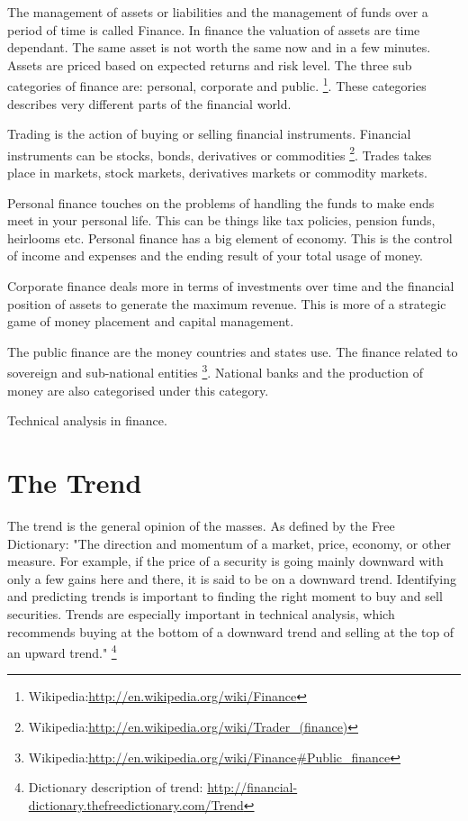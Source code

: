 
The management of assets or liabilities and the management of funds over a
period of time is called Finance. In finance the valuation of assets are time
dependant. The same asset is not worth the same now and in a few minutes. Assets are
priced based on expected returns and risk level. The three sub categories of
finance are: personal, corporate and public. 
\footnote{Wikipedia:\url{http://en.wikipedia.org/wiki/Finance}}.
These categories describes very different parts of the financial world. 

Trading is the action of buying or selling financial instruments.
Financial instruments can be stocks, bonds, derivatives or commodities 
\footnote{Wikipedia:\url{http://en.wikipedia.org/wiki/Trader_(finance)}}.
Trades takes place in markets,  stock markets, derivatives markets or commodity
markets.

Personal finance touches on the problems of handling the funds to make ends
meet in your personal life. This can be things like tax policies, pension
funds, heirlooms etc. Personal finance has a big element of economy. This is
the control of income and expenses and the ending result of your total usage of
money.  

Corporate finance deals more in terms of investments over time and the
financial position of assets to generate the maximum revenue. This is more of a
strategic game of money placement and capital management. 

The public finance are the money countries and states use. The finance related
to sovereign and sub-national entities
\footnote{Wikipedia:\url{http://en.wikipedia.org/wiki/Finance#Public_finance}}.
National banks and the production of money are also categorised under this
category.

Technical analysis in finance. 


\section{The Trend}
The trend is the general opinion of the masses. As defined by the Free
Dictionary:  
"The direction and momentum of a market, price, economy, or other measure. For
example, if the price of a security is going mainly downward with only a few
gains here and there, it is said to be on a downward trend. Identifying and
predicting trends is important to finding the right moment to buy and sell
securities. Trends are especially important in technical analysis, which
recommends buying at the bottom of a downward trend and selling at the top of an
upward trend."
\footnote{Dictionary description of trend: \url{http://financial-dictionary.thefreedictionary.com/Trend}}

